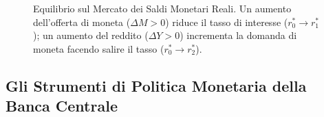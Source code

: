 \begin{figure}[htbp]
\caption{Equilibrio sul Mercato dei Saldi Monetari Reali. Un aumento dell'offerta di moneta ($\Delta M > 0$) riduce il tasso di interesse ($r_0^* \to r_1^*$); un aumento del reddito ($\Delta Y > 0$) incrementa la domanda di moneta facendo salire il tasso ($r_0^* \to r_2^*$).}
\label{fig:equilibrio_mercato_monetario}
\end{figure}

\subsection{Gli Strumenti di Politica Monetaria della Banca Centrale}

